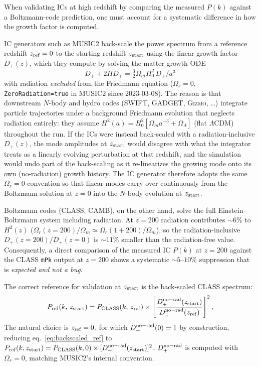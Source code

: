 \documentclass[12pt]{article}
\begin{document}
When validating ICs at high redshift by comparing the measured $P(k)$
against a Boltzmann-code prediction, one must account for a systematic
difference in how the growth factor is computed.

IC generators such as MUSIC2 back-scale the power spectrum from a
reference redshift $z_{\rm ref}=0$ to the starting redshift $z_{\rm
start}$ using the linear growth factor $D_+(z)$, which they compute
by solving the matter growth ODE
\begin{equation}
  \ddot{D}_+ + 2H\dot{D}_+ = \tfrac{3}{2}\Omega_m H_0^2 \, D_+ / a^3
\end{equation}
with radiation \emph{excluded} from the Friedmann equation
($\Omega_r = 0$, \texttt{ZeroRadiation=true} in MUSIC2 since
2023-03-08).  The reason is that downstream $N$-body and hydro
codes (SWIFT, GADGET, \textsc{Gizmo}, \ldots) integrate particle
trajectories under a background Friedmann evolution that neglects
radiation entirely: they assume $H^2(a) = H_0^2[\Omega_m a^{-3} +
\Omega_\Lambda]$ (flat $\Lambda$CDM) throughout the run.  If the
ICs were instead back-scaled with a radiation-inclusive $D_+(z)$,
the mode amplitudes at $z_{\rm start}$ would disagree with what
the integrator treats as a linearly evolving perturbation at that
redshift, and the simulation would undo part of the back-scaling
as it re-linearizes the growing mode onto its own (no-radiation)
growth history.  The IC generator therefore adopts the same
$\Omega_r = 0$ convention so that linear modes carry over
continuously from the Boltzmann solution at $z=0$ into the
$N$-body evolution at $z_{\rm start}$.

Boltzmann codes (CLASS, CAMB), on the other hand, solve the full
Einstein--Boltzmann system including radiation.  At $z=200$ radiation
contributes $\sim 6\%$ to $H^2(z)$
($\Omega_r(z{=}200)/\Omega_m \simeq \Omega_r(1+200)/\Omega_m$), so
the radiation-inclusive $D_+(z=200)/D_+(z=0)$ is $\sim 11\%$ smaller
than the radiation-free value.  Consequently, a direct comparison of
the measured IC $P(k)$ at $z=200$ against the CLASS \texttt{mPk}
output at $z=200$ shows a systematic $\sim 5$--$10\%$ suppression
that is \emph{expected and not a bug}.

The correct reference for validation at $z_{\rm start}$ is the
back-scaled CLASS spectrum:
\begin{equation}
  P_{\rm ref}(k,\,z_{\rm start})
  = P_{\rm CLASS}(k,\,z_{\rm ref})
    \times \left[\frac{D_+^{\rm no-rad}(z_{\rm start})}
                      {D_+^{\rm no-rad}(z_{\rm ref})}\right]^2,
  \label{eq:backscaled_ref}
\end{equation}
The natural choice is $z_{\rm ref}=0$, for which $D_+^{\rm no-rad}(0)=1$ by
construction, reducing eq.~\eqref{eq:backscaled_ref} to
$P_{\rm ref}(k,z_{\rm start}) = P_{\rm CLASS}(k,0)\times
[D_+^{\rm no-rad}(z_{\rm start})]^2$.
$D_+^{\rm no-rad}$ is computed with $\Omega_r=0$, matching MUSIC2's internal convention.
\end{document}
